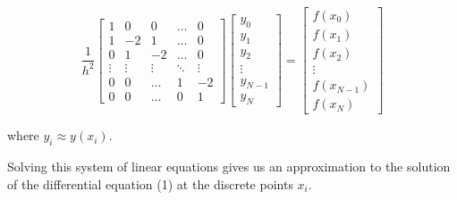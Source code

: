 \documentclass{article}
\begin{document}
\begin{equation}
\frac{1}{h^2} \begin{bmatrix}
1 & 0 & 0 & \dots & 0 \\
1 & -2 & 1 & \dots & 0 \\
0 & 1 & -2 & \dots & 0 \\
\vdots & \vdots & \vdots & \ddots & \vdots \\
0 & 0 & \dots & 1 & -2 \\
0 & 0 & \dots & 0 & 1
\end{bmatrix} \begin{bmatrix}
y_0 \\
y_1 \\
y_2 \\
\vdots \\
y_{N-1} \\
y_N
\end{bmatrix} = \begin{bmatrix}
f(x_0) \\
f(x_1) \\
f(x_2) \\
\vdots \\
f(x_{N-1}) \\
f(x_N)
\end{bmatrix}
\end{equation}

where $y_i \approx y(x_i)$.

Solving this system of linear equations gives us an approximation to the solution of the differential equation (1) at the discrete points $x_i$.
\end{document}
